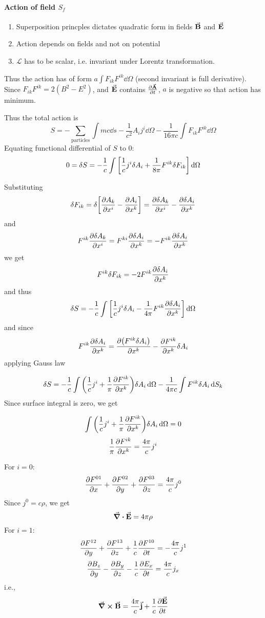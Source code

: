 \paragraph{Action of field $S_f$}
\begin{enumerate}
	\item Superposition princples dictates quadratic form in fields $\va{B}$ and $\va{E}$
	\item Action depends on fields and not on potential
	\item $\mathcal{L}$ has to be scalar, i.e. invariant under Lorentz transformation.
\end{enumerate}
Thus the action has of form $a\int F_{ik}F^{ik} \dd{\Omega}$ (second invariant is full derivative). Since $F_{ik}F^{ik}=2(B^2-E^2)$, and $\va{E}$ contains $\pdv{\va{A}}{t}$, $a$ is negative so that action has minimum.

Thus the total action is
$$S = -\sum_{\text{particles}} \int mc \dd{s} - \frac{1}{c^2}A_i j^i \dd{\Omega} - \frac{1}{16\pi c} \int F_{ik}F^{ik} \dd{\Omega}$$
Equating functional differential of $S$ to $0$:
$$0 = \delta S = -\frac{1}{c} \int \qty[\frac{1}{c} j^i \delta A_i + \frac{1}{8\pi} F^{ik}\delta F_{ik}] \dd{\Omega}$$

Substituting
$$\delta F_{ik} = \delta \qty[\pdv{A_k}{x^i} - \pdv{A_i}{x^k}] = \pdv{\delta A_k}{x^i}-\pdv{\delta A_i}{x^k}$$
and
$$F^{ik} \pdv{\delta A_k}{x^i} =F^{ki}  \pdv{\delta A_i}{x^k} = - F^{ik} \pdv{\delta A_i}{x^k} $$
we get
$$F^{ik} \delta F_{ik} = -2 F^{ik}\pdv{\delta A_i}{x^k}  $$
and thus
$$\delta S = -\frac{1}{c} \int \qty[\frac{1}{c} j^i \delta A_i - \frac{1}{4\pi} F^{ik}\pdv{\delta A_i}{x^k} ] \dd{\Omega}$$
and since
$$F^{ik}\pdv{\delta A_i}{x^k} = \pdv{\qty(F^{ik}\delta A_i)}{x^k} - \pdv{F^{ik}}{x^k} \delta A_i$$
applying Gauss law

$$\delta S = -\frac{1}{c} \int \qty(\frac{1}{c} j^i  + \frac{1}{\pi}\pdv{F^{ik}}{x^k})\delta A_i \dd{\Omega}- \frac{1}{4\pi c} \int F^{ik} \delta A_i \dd{S_k}$$
Since surface integral is zero, we get

$$\int \qty(\frac{1}{c} j^i  + \frac{1}{\pi}\pdv{F^{ik}}{x^k})\delta A_i \dd{\Omega} = 0$$
$$ \frac{1}{\pi}\pdv{F^{ik}}{x^k} = \frac{4\pi}{c} j^i  $$


For $i=0$:
$$\pdv{F^{01}}{x}+\pdv{F^{02}}{y}+\pdv{F^{03}}{z} = \frac{4\pi }{c} j^0$$
Since $j^0 = c\rho$, we get
$$\div{\va{E}} = 4\pi \rho$$
For $i=1$:
$$\pdv{F^{12}}{y}+\pdv{F^{13}}{z}+\frac{1}{c}\pdv{F^{10}}{t} = -\frac{4\pi }{c} j^1$$
$$\pdv{B_z}{y} - \pdv{B_y}{z} - \frac{1}{c} \pdv{E_x}{t} = \frac{4\pi}{c} j_x$$
i.e.,
$$\curl{\va{B}} = \frac{4\pi}{c} \va{j} + \frac{1}{c} \pdv{\va{E}}{t}$$

